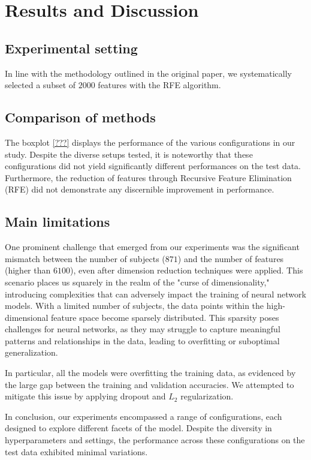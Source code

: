 
\section{Results and Discussion}


\subsection{Experimental setting}

In line with the methodology outlined in the original paper, we systematically selected a subset of $2000$ features with the RFE algorithm. 



\subsection{Comparison of methods}

The boxplot \ref{???} displays the performance of the various configurations in our study. Despite the diverse setups tested, it is noteworthy that these configurations did not yield significantly different performances on the test data. Furthermore, the reduction of features through Recursive Feature Elimination (RFE) did not demonstrate any discernible improvement in performance.


\subsection{Main limitations}


One prominent challenge that emerged from our experiments was the significant mismatch between the number of subjects ($871$) and the number of features (higher than $6100$), even after dimension reduction techniques were applied. This scenario places us squarely in the realm of the "curse of dimensionality," introducing complexities that can adversely impact the training of neural network models. With a limited number of subjects, the data points within the high-dimensional feature space become sparsely distributed. This sparsity poses challenges for neural networks, as they may struggle to capture meaningful patterns and relationships in the data, leading to overfitting or suboptimal generalization.

In particular, all the models were overfitting the training data, as evidenced by the large gap between the training and validation accuracies. We attempted to mitigate this issue by applying dropout and $L_2$ regularization. 

In conclusion, our experiments encompassed a range of configurations, each designed to explore different facets of the model. Despite the diversity in hyperparameters and settings, the performance across these configurations on the test data exhibited minimal variations.